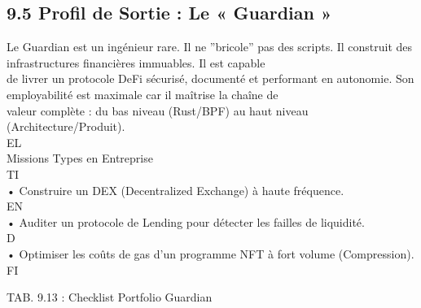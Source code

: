 \subsection{9.5 Profil de Sortie : Le « Guardian »}
Le Guardian est un ingénieur rare. Il ne ”bricole” pas des scripts. Il construit des infrastructures financières immuables. Il est capable\\
de livrer un protocole DeFi sécurisé, documenté et performant en autonomie. Son employabilité est maximale car il maîtrise la chaîne de\\
valeur complète : du bas niveau (Rust/BPF) au haut niveau (Architecture/Produit).\\
\vspace{0.5em}
\vspace{0.5em}
\vspace{0.5em}
\vspace{0.5em}
EL\\
Missions Types en Entreprise\\
\vspace{0.5em}
\vspace{0.5em}
\vspace{0.5em}
\vspace{0.5em}
TI\\
• Construire un DEX (Decentralized Exchange) à haute fréquence.\\
\vspace{0.5em}
\vspace{0.5em}
\vspace{0.5em}
\vspace{0.5em}
EN\\
• Auditer un protocole de Lending pour détecter les failles de liquidité.\\
\vspace{0.5em}
\vspace{0.5em}
\vspace{0.5em}
\vspace{0.5em}
D\\
• Optimiser les coûts de gas d’un programme NFT à fort volume (Compression).\\
\vspace{0.5em}
\vspace{0.5em}
\vspace{0.5em}
\vspace{0.5em}
FI\\
\begin{center}\begin{tabular}TAB. 9.13 : Checklist Portfolio Guardian\end{tabular}\end{center}
